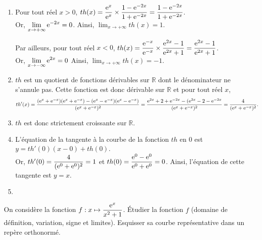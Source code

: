 \documentclass[11pt,fleqn, openany]{book} %
\begin{document}
\begin{solution}\hspace{0pt}
\begin{enumerate}
\item Pour tout réel $x>0$,  $th(x)=\dfrac{\mathrm{e}^x}{\mathrm{e}^x} \times \dfrac{1-\mathrm{e}^{-2x}}{1+\mathrm{e}^{-2x}} = \dfrac{1-\mathrm{e}^{-2x}}{1+\mathrm{e}^{-2x}}$.\\ Or, $\displaystyle\lim_{x\to+\infty}\mathrm{e}^{-2x}=0$. Ainsi, $\displaystyle\lim_{x \to +\infty}th(x)=1$.

Par ailleurs, pour tout réel $x<0$, $th(x)=\dfrac{\mathrm{e}^{-x}}{\mathrm{e}^{-x}} \times \dfrac{\mathrm{e}^{2x}-1}{\mathrm{e}^{2x}+1} = \dfrac{\mathrm{e}^{2x}-1}{\mathrm{e}^{2x}+1} $. \\Or, $\displaystyle\lim_{x\to -\infty}\mathrm{e}^{2x}=0$ Ainsi, $\displaystyle\lim_{x\to+\infty}th(x)=-1$.

\item $th$ est un quotient de fonctions dérivables sur $\mathbb{R}$ dont le dénominateur ne s'annule pas. Cette fonction est donc dérivable sur $\mathbb{R}$ et pour tout réel $x$,
\[th'(x)=\dfrac{(\mathrm{e}^x+\mathrm{e}^{-x})(\mathrm{e}^x+\mathrm{e}^{-x})-(\mathrm{e}^x-\mathrm{e}^{-x})(\mathrm{e}^x-\mathrm{e}^{-x})}{(\mathrm{e}^x+\mathrm{e}^{-x})^2}=\dfrac{\mathrm{e}^{2x}+2+\mathrm{e}^{-2x}-(\mathrm{e}^{2x}-2-\mathrm{e}^{-2x}}{(\mathrm{e}^x+\mathrm{e}^{-x})^2}=\dfrac{4}{(\mathrm{e}^x+\mathrm{e}^{-x})^2}.\]
\item $th$ est donc strictement croissante sur $\mathbb{R}$.
\item L'équation de la tangente à la courbe de la fonction $th$ en 0 est $y=th'(0)(x-0)+th(0)$.\\ Or, $th'(0)=\dfrac{4}{(\mathrm{e}^0+\mathrm{e}^0)^2}=1$ et $th(0)=\dfrac{\mathrm{e}^0-\mathrm{e}^0}{\mathrm{e}^0+\mathrm{e}^0}=0$. Ainsi, l'équation de cette tangente est $y=x$.
\item \begin{center}
\end{center}
\end{enumerate}

\end{solution}




\begin{exercise}[topic=lim23]
On considère la fonction $f:x\mapsto \dfrac{\mathrm{e}^x}{x^2+1}$. Étudier la fonction $f$ (domaine de définition, variation, signe et limites). Esquisser sa courbe représentative dans un repère orthonormé.\end{exercise}
\end{document}
